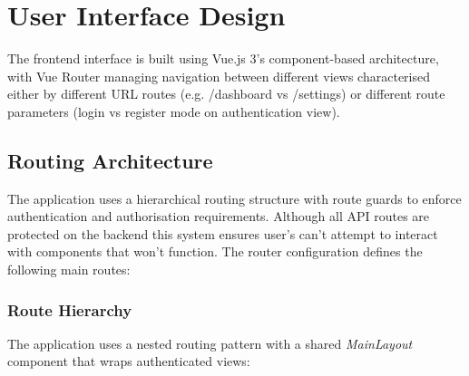 \section{User Interface Design}

The frontend interface is built using Vue.js 3's component-based architecture, with Vue Router managing navigation between different views characterised either by different URL routes (e.g. /dashboard vs /settings) or different route parameters (login vs register mode on authentication view).

\subsection{Routing Architecture}

The application uses a hierarchical routing structure with route guards to enforce authentication and authorisation requirements. Although all API routes are protected on the backend this system ensures user's can't attempt to interact with components that won't function. The router configuration defines the following main routes:


\subsubsection*{Route Hierarchy}

The application uses a nested routing pattern with a shared \textit{MainLayout} component that wraps authenticated views:

